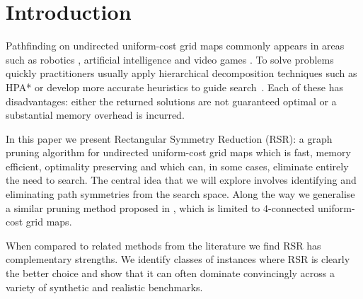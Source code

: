 \section{Introduction}
\label{sec:introduction}
Pathfinding on undirected uniform-cost grid maps commonly appears in 
areas such as robotics \cite{lee09},
artificial intelligence \cite{wang09} and video games \cite{davis00,sturtevant10}.  
To solve problems quickly practitioners usually apply
hierarchical decomposition techniques such as HPA* \cite{botea04,sturtevant10} or 
develop more accurate heuristics to guide search~\cite{bjornsson06,sturtevant09,goldenberg10}.  
Each of these has disadvantages: either the returned solutions are
not guaranteed optimal or a substantial memory overhead is incurred.
\par
In this paper we present Rectangular Symmetry Reduction (RSR): a graph pruning
algorithm for undirected uniform-cost grid maps which is fast, memory efficient,
optimality preserving and which can, in some cases, eliminate entirely the need
to search.  
The central idea that we will explore involves identifying and eliminating 
path symmetries from the search space.
Along the way we generalise a similar pruning method proposed in \cite{harabor10},
which is limited to 4-connected uniform-cost grid maps.
\par
When compared to related methods from the literature we
find RSR has complementary strengths. We identify classes of instances
where RSR is clearly the better choice and show that it can often dominate convincingly
across a variety of synthetic and realistic benchmarks.

